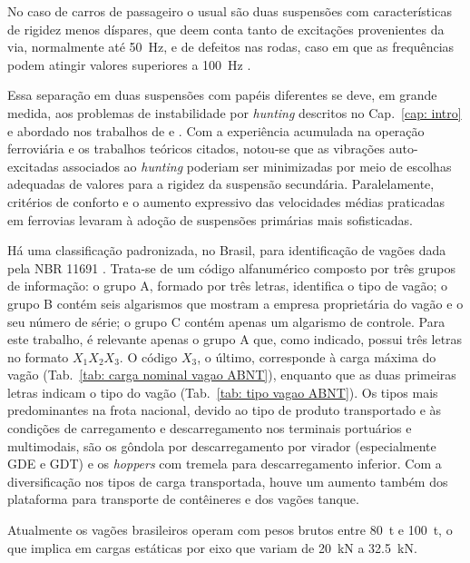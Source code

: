 No caso de carros de passageiro o usual são duas suspensões com características de rigidez menos díspares, que deem conta tanto de excitações provenientes da via, normalmente até \SI{50}{\hertz}, e de defeitos nas rodas, caso em que as frequências podem atingir valores superiores a \SI{100}{Hz} \cite{barbosa_aplicacao_1999,knothe_modelling_1993}.

Essa separação em duas suspensões com papéis diferentes se deve, em grande medida, aos problemas de instabilidade por \textit{hunting} descritos no Cap.~\ref{cap: intro} e abordado nos trabalhos de  e . Com a experiência acumulada na operação ferroviária e os trabalhos teóricos citados, notou-se que as vibrações auto-excitadas associados ao \textit{hunting} poderiam ser minimizadas por meio de escolhas adequadas de valores para a rigidez da suspensão secundária. Paralelamente, critérios de conforto e o aumento expressivo das velocidades médias praticadas em ferrovias levaram à adoção de suspensões primárias mais sofisticadas.

Há uma classificação padronizada, no Brasil, para identificação de vagões dada pela NBR 11691 \cite{associacao_brasileira_de_normas_tecnicas_vagao_2019}. Trata-se de um código alfanumérico composto por três grupos de informação: o grupo A, formado por três letras, identifica o tipo de vagão; o grupo B contém seis algarismos que mostram a empresa proprietária do vagão e o seu número de série; o grupo C contém apenas um algarismo de controle. Para este trabalho, é relevante apenas o grupo A que, como indicado, possui três letras no formato $X_1X_2X_3$. O código $X_3$, o último, corresponde à carga máxima do vagão (Tab.~\ref{tab: carga nominal vagao ABNT}), enquanto que as duas primeiras letras indicam o tipo do vagão (Tab.~\ref{tab: tipo vagao ABNT}). Os tipos mais predominantes na frota nacional, devido ao tipo de produto transportado e às condições de carregamento e descarregamento nos terminais portuários e multimodais, são 
os gôndola por descarregamento por virador (especialmente GDE e GDT) e os \textit{hoppers} com tremela para descarregamento inferior. Com a diversificação nos tipos de
carga transportada, houve um aumento também dos plataforma para transporte de contêineres e dos vagões tanque.

Atualmente os vagões brasileiros operam com pesos brutos entre \SI{80}{\tonne} e \SI{100}{\tonne}, o que implica em cargas estáticas por eixo que variam de \SI{20}{\kilo\newton} a \SI{32,5}{\kilo\newton}.


